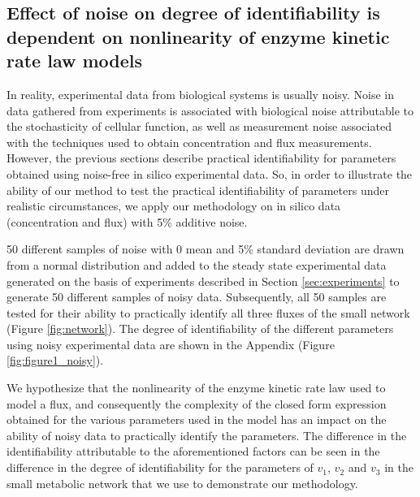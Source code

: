 \documentclass[10pt]{article}
\begin{document}
	\subsection{Effect of noise on degree of identifiability is dependent on nonlinearity of enzyme kinetic rate law models}\label{sec:noise}
	In reality, experimental data from biological systems is usually noisy. Noise in data gathered from experiments is associated with biological noise attributable to the stochasticity of cellular function, as well as measurement noise associated with the techniques used to obtain concentration and flux measurements. However, the previous sections describe practical identifiability for parameters obtained using noise-free in silico experimental data. So, in order to illustrate the ability of our method to test the practical identifiability of parameters under realistic circumstances, we apply our methodology on in silico data (concentration and flux) with 5\% additive noise. 
	
	50 different samples of noise with 0 mean and 5\% standard deviation are drawn from a normal distribution and added to the steady state experimental data generated on the basis of experiments described in Section \ref{sec:experiments} to generate 50 different samples of noisy data. Subsequently, all 50 samples are tested for their ability to practically identify all three fluxes of the small network (Figure \ref{fig:network}). The degree of identifiability of the different parameters using noisy experimental data are shown in the Appendix (Figure \ref{fig:figure1_noisy}). 
	
	We hypothesize that the nonlinearity of the enzyme kinetic rate law used to model a flux, and consequently the complexity of the closed form expression obtained for the various parameters used in the model has an impact on the ability of noisy data to practically identify the parameters. The difference in the identifiability attributable to the aforementioned factors can be seen in the difference in the degree of identifiability for the parameters of $v_1$, $v_2$ and $v_3$ in the small metabolic network that we use to demonstrate our methodology. 
	
\end{document}
